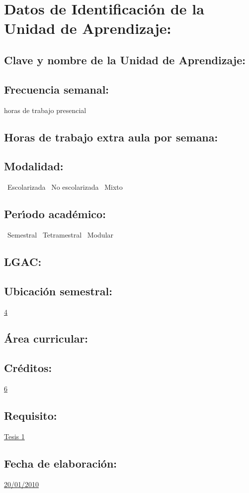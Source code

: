 \documentclass[10 pt]{article}
\begin{document}


\section{Datos de Identificaci\'{o}n de la Unidad de Aprendizaje:}
\subsection{Clave y nombre de la Unidad de Aprendizaje:} 
\subsection{Frecuencia semanal:} horas de trabajo presencial 
\subsection{Horas de trabajo extra aula por semana:} 
\subsection{Modalidad:} \yes~Escolarizada \no~No escolarizada \no~Mixto
\subsection{Per\'{\i}odo acad\'{e}mico:} \yes~Semestral
\no~Tetramestral \no~Modular
\subsection{LGAC:} \underline{\odsi}
\subsection{Ubicaci\'{o}n semestral:} \underline{4}
\subsection{\'{A}rea curricular:} \underline{\pi}
\subsection{Cr\'{e}ditos:} \underline{6}
\subsection{Requisito:} \underline{Tesis 1}
\subsection{Fecha de elaboraci\'{o}n:} \underline{20/01/2010}
\end{document}
